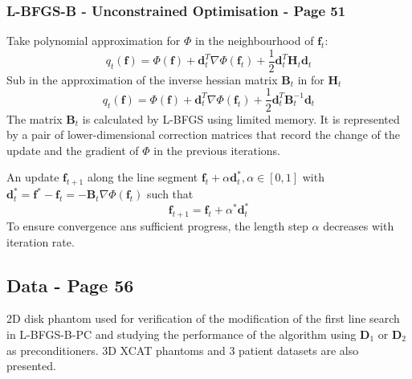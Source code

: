 \documentclass{article}
\begin{document}
\subsubsection{L-BFGS-B - Unconstrained Optimisation - Page 51}
Take polynomial approximation for $\Phi$ in the neighbourhood of $\textbf{f}_t$:
\[q_t(\textbf{f}) = \Phi(\textbf{f}) + \textbf{d}_t^T \nabla \Phi (\textbf{f}_t) +\frac{1}{2} \textbf{d}_t^T \textbf{H}_t \textbf{d}_t\]
Sub in the approximation of the inverse hessian matrix $\textbf{B}_t$ in for $\textbf{H}_t$
\[q_t(\textbf{f}) = \Phi(\textbf{f}) + \textbf{d}_t^T \nabla \Phi (\textbf{f}_t) +\frac{1}{2} \textbf{d}_t^T \textbf{B}_t^{-1} \textbf{d}_t\]
The matrix $\textbf{B}_t$ is calculated by L-BFGS using limited memory. It is represented by a pair of lower-dimensional correction matrices that record the change of the update and the gradient of $\Phi$ in the previous iterations.

An update $\textbf{f}_{t+1}$ along the line segment $\textbf{f}_t + \alpha \textbf{d}_t^* , \alpha \in [0,1]$ with $\textbf{d}_t^* = \textbf{f}^* - \textbf{f}_t = - \textbf{B}_t \nabla \Phi (\textbf{f}_t)$ such that
\[\textbf{f}_{t+1} = \textbf{f}_t + \alpha^* \textbf{d}_t^*\]
To ensure convergence ans sufficient progress, the length step $\alpha$ decreases with iteration rate. 


\subsection{Data - Page 56}
2D disk phantom used for verification of the modification of the first line search in L-BFGS-B-PC and studying the performance of the algorithm using $\textbf{D}_1$ or $\textbf{D}_2$ as preconditioners. 3D XCAT phantoms and 3 patient datasets are also presented.
\end{document}
